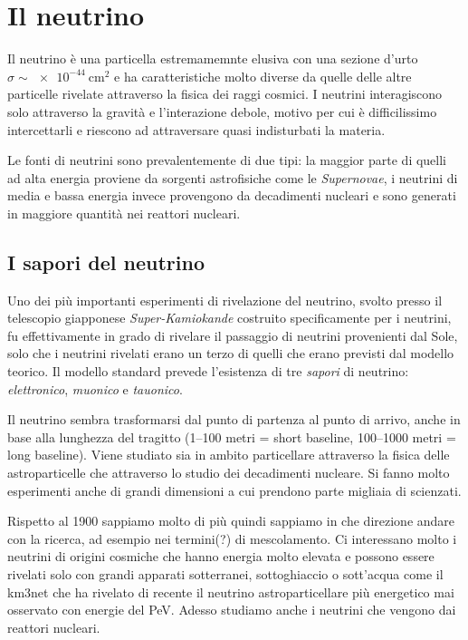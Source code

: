     \section{Il neutrino}
        Il neutrino è una particella estremamemnte elusiva con una sezione d'urto $\sigma \sim \SI{e-44}{\centi\meter\squared}$ e ha caratteristiche molto diverse da quelle delle altre particelle rivelate attraverso la fisica dei raggi cosmici. I neutrini interagiscono solo attraverso la gravità e l'interazione debole, motivo per cui è difficilissimo intercettarli e riescono ad attraversare quasi indisturbati la materia.

        Le fonti di neutrini sono prevalentemente di due tipi: la maggior parte di quelli ad alta energia proviene da sorgenti astrofisiche come le \textit{Supernovae}, i neutrini di media e bassa energia invece provengono da decadimenti nucleari e sono generati in maggiore quantità nei reattori nucleari.
        \subsection{I sapori del neutrino}
            Uno dei più importanti esperimenti di rivelazione del neutrino, svolto presso il telescopio giapponese \emph{Super-Kamiokande} costruito specificamente per i neutrini, fu effettivamente in grado di rivelare il passaggio di neutrini provenienti dal Sole, solo che i neutrini rivelati erano un terzo di quelli che erano previsti dal modello teorico.
            Il modello standard prevede l'esistenza di tre \emph{sapori} di neutrino: \emph{elettronico}, \emph{muonico} e \emph{tauonico}.

            Il neutrino sembra trasformarsi dal punto di partenza al punto di arrivo, anche in base alla lunghezza del tragitto (1--100 metri = short baseline, 100--1000 metri = long baseline). Viene studiato sia in ambito particellare attraverso la fisica delle astroparticelle che attraverso lo studio dei decadimenti nucleare. Si fanno molto esperimenti anche di grandi dimensioni a cui prendono parte migliaia di scienzati.

        Rispetto al 1900 sappiamo molto di più quindi sappiamo in che direzione andare con la ricerca, ad esempio nei termini(?) di mescolamento. Ci interessano molto i neutrini di origini cosmiche che hanno energia molto elevata e possono essere rivelati solo con grandi apparati sotterranei, sottoghiaccio o sott'acqua come il km3net che ha rivelato di recente il neutrino astroparticellare più energetico mai osservato con energie del PeV. Adesso studiamo anche i neutrini che vengono dai reattori nucleari.
        
